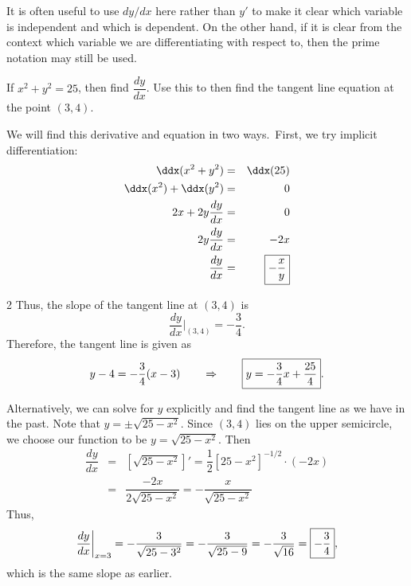 \documentclass{book}
\begin{document}
It is often useful to use $dy/dx$ here rather than $y'$ to make it clear which variable is independent and which is dependent. On the other hand, if it is clear from the context which variable we are differentiating with respect to, then the prime notation may still be used. 

\begin{Exam} If $x^2+y^2=25$, then find $\dfrac{dy}{dx}$. Use this to then find the tangent line equation at the point $(3,4)$.

We will find this derivative and equation in two ways.\footnotemark\  First, we try implicit differentiation:
\begin{eqnarray*}
\ddx(x^2+y^2) &=& \ddx(25)\\
\ddx(x^2) + \ddx(y^2) &=& 0\\
2x + 2y\dfrac{dy}{dx} &=& 0\\
2y\dfrac{dy}{dx} &=& -2x\\
\dfrac{dy}{dx} &=& \fbox{$-\dfrac{x}{y}$}
\end{eqnarray*} 
\begin{multicols}{2}
Thus, the slope of the tangent line at $(3,4)$ is 
\[\dfrac{dy}{dx}\bigg\vert_{(3,4)} = -\dfrac{3}{4}.\] Therefore, the tangent line is given as 
\[y-4 = -\dfrac{3}{4}(x-3) \qquad \Rightarrow \qquad \fbox{$y=-\dfrac{3}{4}x + \dfrac{25}{4}$}.\]\vfill
\begin{center}
\end{center}
\end{multicols}

Alternatively, we can solve for $y$ explicitly and find the tangent line as we have in the past. Note that $y=\pm\sqrt{25-x^2}$. Since $(3,4)$ lies on the upper semicircle, we choose our function to be $y = \sqrt{25-x^2}$. Then
\begin{eqnarray*}
\dfrac{dy}{dx} &=& \left[\sqrt{25-x^2}\right]' = \dfrac{1}{2}\left[25-x^2\right]^{-1/2}\cdot (-2x)\\
&=& \dfrac{-2x}{2\sqrt{25-x^2}} = -\dfrac{x}{\sqrt{25-x^2}}
\end{eqnarray*} Thus, 
\[\dfrac{dy}{dx}\bigg|_{x=3} = -\dfrac{3}{\sqrt{25-3^2}} = -\dfrac{3}{\sqrt{25-9}} = - \dfrac{3}{\sqrt{16}} = \fbox{$-\dfrac{ 3}{4}$},\] which is the same slope as earlier.
\end{Exam}\vs 
\end{document}
